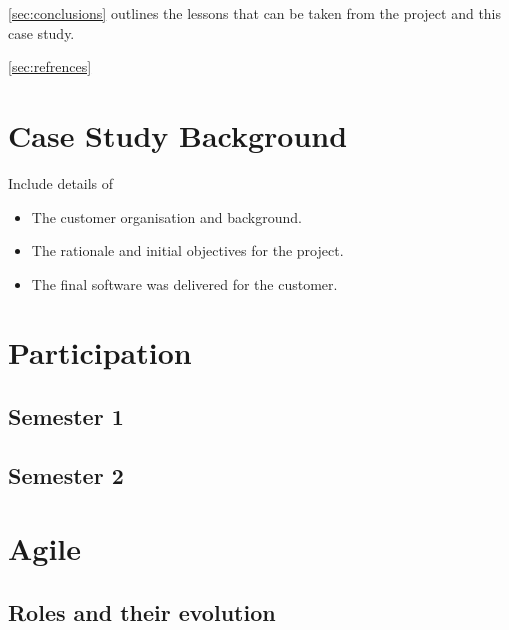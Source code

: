 \documentclass{l3proj}
\begin{document}
\ref{sec:conclusions} outlines the lessons that can be taken from the project and this case study.

\ref{sec:refrences}
\section{Case Study Background}
\label{sec:background}

Include details of 

\begin{itemize}
\item The customer organisation and background.
\item The rationale and initial objectives for the project.
\item The final software was delivered for the customer.
\end{itemize}

\section{Participation}
\label{sec:participation}

\subsection{Semester 1}

\subsection{Semester 2}

\section{Agile}
\label{sec:agile}

\subsection{Roles and their evolution}
\end{document}

